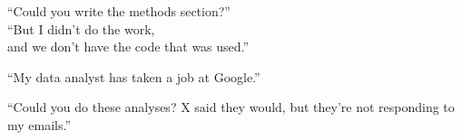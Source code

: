 \documentclass[aspectratio=169,12pt,t]{beamer}
\begin{document}
\begin{frame}[c]{}

\begin{center}
  \Large


  ``Could you write the methods section?'' \\[36pt]
  ``But I didn't do the work, \\
  and we don't have the code that was used.''



\end{center}

\end{frame}





\begin{frame}[c]{}

\begin{center}
  \Large


``My data analyst has taken a job at Google.''

\end{center}

\end{frame}



\begin{frame}[c]{}

\begin{center}
  \Large


``Could you do these analyses? X said they would, but they're not
  responding to my emails.''

\end{center}

\end{frame}
\end{document}
